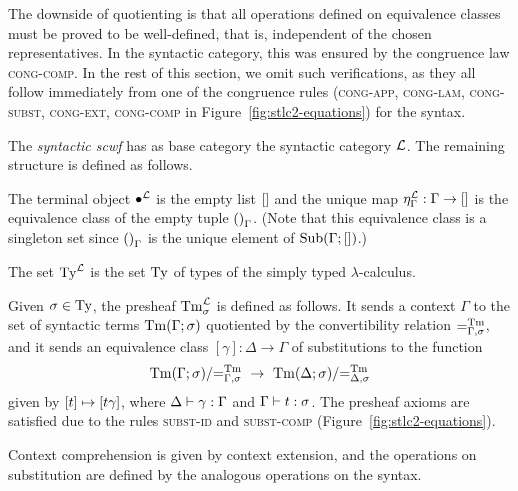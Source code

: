 The downside of quotienting is that all operations defined on equivalence classes must be proved to be well-defined, that is, independent of the chosen representatives. In the syntactic category, this was ensured by the congruence law \textsc{cong-comp}. In the rest of this section, we omit such verifications, as they all follow immediately from one of the congruence rules (\textsc{cong-app}, \textsc{cong-lam}, \textsc{cong-subst}, \textsc{cong-ext}, \textsc{cong-comp} in Figure~\ref{fig:stlc2-equations}) for the syntax.

\begin{defn} \label{def:syn-scwf}
The \emph{syntactic scwf} has as base category the syntactic category $\syncat$. The remaining structure is defined as follows.
\begin{enum}
    \item The terminal object $\Sempcon[\syncat]$ is the empty list $\sempcon$ and the unique map $\Sempsub[\Gamma][\syncat] : \Gamma \to \sempcon$ is the equivalence class of the empty tuple $\sempsub[\Gamma]$. (Note that this equivalence class is a singleton set since $\sempsub[\Gamma]$ is the unique element of $\sSub{\Gamma}{\sempcon}$.)

    \item The set $\STy[\syncat]$ is the set $\sTy$ of types of the simply typed $\lambda$-calculus.

    \item Given $\sigma \in \sTy$, the presheaf $\STm{\sigma}[\syncat]$ is defined as follows. It sends a context $\Gamma$ to the set of syntactic terms $\sTm{\Gamma}{\sigma}$ quotiented by the convertibility relation $\sconvreltm{\Gamma}{\sigma}$, and it sends an equivalence class $[\gamma] : \Delta \to \Gamma$ of substitutions to the function
    \[ \sTm{\Gamma}{\sigma}/\sconvreltm{\Gamma}{\sigma} \ \to\ 
        \sTm{\Delta}{\sigma}/\sconvreltm{\Delta}{\sigma} \]
    given by $[t] \mapsto [\ssubst{t}{\gamma}]$, where $\stypedsub{\gamma}{\Delta}{\Gamma}$ and $\stypedtm{t}{\Gamma}{\sigma}$. The presheaf axioms are satisfied due to the rules \textsc{subst-id} and \textsc{subst-comp} (Figure~\ref{fig:stlc2-equations}).

    \item Context comprehension is given by context extension, and the operations on substitution are defined by the analogous operations on the syntax.
\end{enum}
\end{defn}

